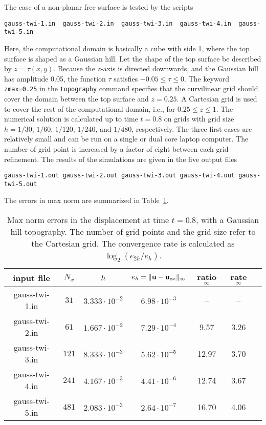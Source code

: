 \documentclass[11pt]{report}
\newcommand{\ub}{{\bf u}}
\begin{document}
The case of a non-planar free surface is tested by the scripts
\begin{verbatim}
gauss-twi-1.in  gauss-twi-2.in  gauss-twi-3.in  gauss-twi-4.in  gauss-twi-5.in
\end{verbatim}
Here, the computational domain is basically a cube with side 1, where the top surface is shaped as a
Gaussian hill. Let the shape of the top surface be described by $z=\tau(x,y)$. Because the $z$-axis
is directed downwards, and the Gaussian hill has amplitude 0.05, the function $\tau$ satisfies
$-0.05\leq \tau\leq 0$. The keyword {\tt zmax=0.25} in the {\tt topography} command specifies that
the curvilinear grid should cover the domain between the top surface and $z=0.25$. A Cartesian grid
is used to cover the rest of the computational domain, i.e., for $0.25\leq z\leq 1$. The numerical
solution is calculated up to time $t=0.8$ on grids with grid size $h=1/30$, $1/60$, $1/120$,
$1/240$, and $1/480$, respectively. The three first cases are relatively small and can be run on a single
or dual core laptop computer. The number of grid point is increased by a factor of eight between each
grid refinement.
The results of the simulations are given in the five output files
\begin{verbatim}
gauss-twi-1.out gauss-twi-2.out gauss-twi-3.out gauss-twi-4.out gauss-twi-5.out
\end{verbatim}
The errors in max norm are summarized in Table~\ref{tab:twi-gauss-err}.
\begin{table}
\begin{center}
\begin{tabular}{| c | c | c | c | c | c  | c | }
\hline
input file & $N_x$ & $h$ & $e_h=\| \ub - \ub_{ex}\|_\infty$  & ratio$_\infty$ & rate$_\infty$ \\ \hline
gauss-twi-1.in & $31$  & $3.333\cdot 10^{-2}$  & $6.98\cdot 10^{-3}$ & --   & --   \\ \hline
gauss-twi-2.in & $61$  & $1.667\cdot 10^{-2}$  & $7.29\cdot 10^{-4}$ & 9.57 & 3.26 \\ \hline
gauss-twi-3.in & $121$ & $8.333\cdot 10^{-3}$  & $5.62\cdot 10^{-5}$ & 12.97 & 3.70 \\ \hline
gauss-twi-4.in & $241$ & $4.167\cdot 10^{-3}$  & $4.41\cdot 10^{-6}$ & 12.74 & 3.67 \\ \hline
gauss-twi-5.in & $481$ & $2.083\cdot 10^{-3}$  & $2.64\cdot 10^{-7}$ & 16.70 & 4.06 \\ \hline
\end{tabular}
\caption{Max norm errors in the displacement at time $t=0.8$, with a Gaussian hill topography. The
  number of grid points and the grid size refer to the Cartesian grid. The convergence rate is
  calculated as $\log_2(e_{2h}/e_h)$. }
\label{tab:twi-gauss-err}
\end{center}
\end{table}
\end{document}
